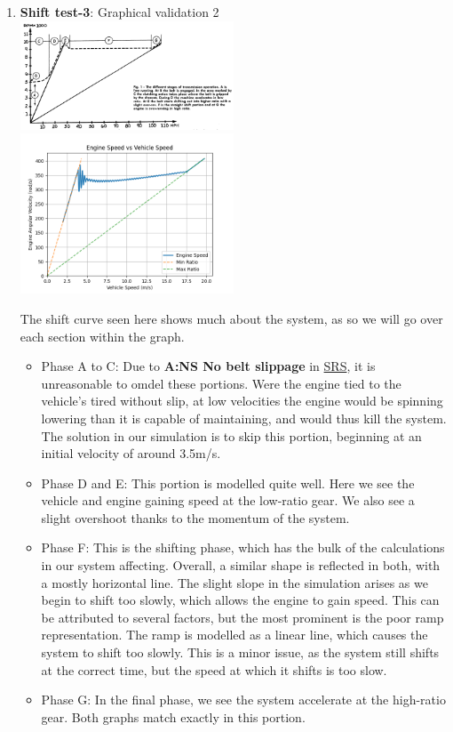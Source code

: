 \documentclass[12pt, titlepage]{article}
\begin{document}
\begin{enumerate}
\item{\textbf{Shift test-3}: Graphical validation 2}\\

\includegraphics[width=0.5\textwidth]{theoretical-figures/shift_curve.png}
\includegraphics[width=0.5\textwidth]{simulation-figures/shift_curve.png}

The shift curve seen here shows much about the system, as so we will go over each section within the graph.
\begin{itemize}
\item{Phase A to C:} Due to \textbf{A:NS No belt slippage} in \href{https://github.com/gr812b/CVT-Simulator/blob/develop/docs/SRS/SRS.pdf}{SRS}, it is unreasonable to omdel these portions. Were the engine tied to the vehicle's tired without slip, at low velocities the engine would be spinning lowering than it is capable of maintaining, and would thus kill the system. The solution in our simulation is to skip this portion, beginning at an initial velocity of around 3.5m/s.
\item {Phase D and E:} This portion is modelled quite well. Here we see the vehicle and engine gaining speed at the low-ratio gear. We also see a slight overshoot thanks to the momentum of the system.
\item {Phase F:} This is the shifting phase, which has the bulk of the calculations in our system affecting. Overall, a similar shape is reflected in both, with a mostly horizontal line. The slight slope in the simulation arises as we begin to shift too slowly, which allows the engine to gain speed. This can be attributed to several factors, but the most prominent is the poor ramp representation. The ramp is modelled as a linear line, which causes the system to shift too slowly. This is a minor issue, as the system still shifts at the correct time, but the speed at which it shifts is too slow.
\item {Phase G:} In the final phase, we see the system accelerate at the high-ratio gear. Both graphs match exactly in this portion.
\end{itemize}


\end{enumerate}
\end{document}
